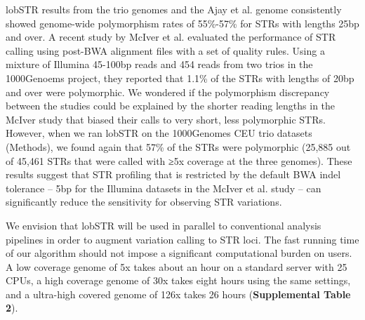 lobSTR results from the trio genomes and the Ajay et al. genome consistently showed genome-wide polymorphism rates of 55\%-57\% for STRs with lengths 25bp and over. A recent study by McIver et al. \cite{McIverFondonSkinnerEtAl2011} evaluated the performance of STR calling using post-BWA alignment files with a set of quality rules. Using a mixture of Illumina 45-100bp reads and 454 reads from two trios in the 1000Genoems project, they reported that 1.1\% of the STRs with lengths of 20bp and over were polymorphic. We wondered if the polymorphism discrepancy between the studies could be explained by the shorter reading lengths in the McIver study that biased their calls to very short, less polymorphic STRs. However, when we ran lobSTR on the 1000Genomes CEU trio datasets (Methods), we found again that 57\% of the STRs were polymorphic (25,885 out of 45,461 STRs that were called with ≥5x coverage at the three genomes). These results suggest that STR profiling that is restricted by the default BWA indel tolerance -- 5bp for the Illumina datasets in the McIver et al. study -- can significantly reduce the sensitivity for observing STR variations. 

We envision that lobSTR will be used in parallel to conventional analysis pipelines in order to augment variation calling to STR loci. The fast running time of our algorithm should not impose a significant computational burden on users. A low coverage genome of 5x takes about an hour on a standard server with 25 CPUs, a high coverage genome of 30x takes eight hours using the same settings, and a ultra-high covered genome of 126x takes 26 hours (\textbf{Supplemental Table 2}).


